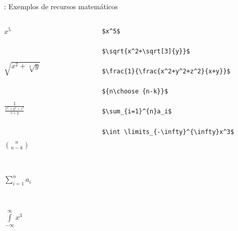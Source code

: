 \documentclass{beamer}
\begin{document}
\begin{frame}[fragile]{\insertsubsection{}: Exemplos de recursos matemáticos}

\begin{columns}
	\begin{column}[t]{.4\textwidth}
		 $x^5$ 
		 
		\
		 
		 $\sqrt{x^2+\sqrt[3]{y}}$ 

		\
		 
		 $\frac{1}{\frac{x^2+y^2+z^2}{x+y}}$ 

		\
		 
		 ${n\choose {n-k}}$  

		\
		 
		 $\sum_{i=1}^{n}a_i$  

		\
		 
		 $\int \limits_{-\infty}^{\infty}x^3$ 

	\end{column}

	\begin{column}[t]{.6\textwidth}
	\begin{verbatim} 
		$x^5$ 
		
		$\sqrt{x^2+\sqrt[3]{y}}$
		
		$\frac{1}{\frac{x^2+y^2+z^2}{x+y}}$ 
		
		${n\choose {n-k}}$ 
		
		$\sum_{i=1}^{n}a_i$ 
		
		$\int \limits_{-\infty}^{\infty}x^3$  
		\end{verbatim}
	\end{column}
\end{columns}

\end{frame}
\end{document}
